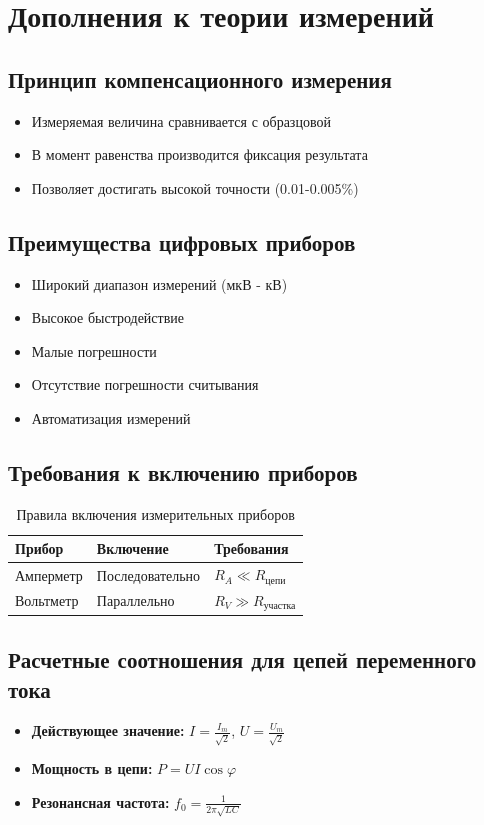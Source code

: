 \documentclass[14pt, a4paper, twoside]{extreport}
\begin{document}
\section{Дополнения к теории измерений}

\subsection{Принцип компенсационного измерения}
\begin{itemize}
  \item Измеряемая величина сравнивается с образцовой
  \item В момент равенства производится фиксация результата
  \item Позволяет достигать высокой точности (0.01-0.005\%)
\end{itemize}

\subsection{Преимущества цифровых приборов}
\begin{itemize}
  \item Широкий диапазон измерений (мкВ - кВ)
  \item Высокое быстродействие
  \item Малые погрешности
  \item Отсутствие погрешности считывания
  \item Автоматизация измерений
\end{itemize}

\subsection{Требования к включению приборов}
\begin{table}[H]
  \centering
  \begin{tabular}{|l|l|l|}
    \hline
    \textbf{Прибор} & \textbf{Включение} & \textbf{Требования} \\
    \hline
    Амперметр & Последовательно & $R_A \ll R_{\text{цепи}}$ \\
    Вольтметр & Параллельно & $R_V \gg R_{\text{участка}}$ \\
    \hline
  \end{tabular}
  \caption{Правила включения измерительных приборов}
\end{table}

\subsection{Расчетные соотношения для цепей переменного тока}
\begin{itemize}
  \item \textbf{Действующее значение:} $I = \frac{I_m}{\sqrt{2}}$, $U = \frac{U_m}{\sqrt{2}}$
  \item \textbf{Мощность в цепи:} $P = UI\cos\varphi$
  \item \textbf{Резонансная частота:} $f_0 = \frac{1}{2\pi\sqrt{LC}}$
\end{itemize}
\end{document}
